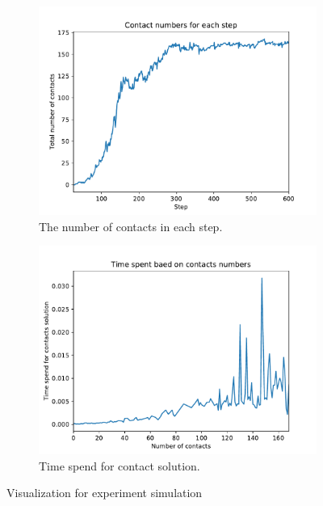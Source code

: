     \begin{figure}[!ht]
        \centering
        \begin{subfigure}[b]{0.7\textwidth}
            \includegraphics[width=\textwidth]{Figures/contact_num}
            \caption{The number of contacts in each step.}
            \label{fig:contactnum}
        \end{subfigure}
        \begin{subfigure}[b]{0.7\textwidth}
            \includegraphics[width=\textwidth]{Figures/contact_time}
            \caption{Time spend for contact solution.}
            \label{fig:contacttime}
        \end{subfigure}
        \caption{Visualization for experiment simulation}
    \end{figure}

